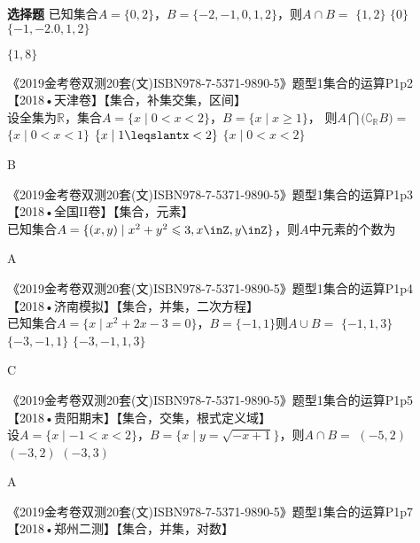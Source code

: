 \begin{exercise}{\bf 选择题}
      已知集合$A=\{0,2\}$，$B=\{-2,-1,0,1,2\}$，则$A\cap B=$\xz
       {$\{1,2\}$}
       {$\{0\}$}
       {$\{-1,-2.0,1,2\}$}
      \begin{answer}
        $\{1,8\}$
      \end{answer}
    \item 《2019金考卷双测20套(文)ISBN978-7-5371-9890-5》题型1集合的运算P1p2【2018•天津卷】【集合，补集交集，区间】\\
      设全集为$\mathbb{R}$，集合$A=\{x\mid 0<x<2\}$，$B=\{x\mid x\geqslant1\}$，
      则$A\bigcap\bigl(\complement_{\mathbb R}B\bigr)=$\xz
       {$\{x\mid 0<x<1\}$}
       {$\{x\mid 1\leqslantx<2\}$}
       {$\{x\mid 0<x<2\}$}
      \begin{answer}
        B
      \end{answer}
    \item 《2019金考卷双测20套(文)ISBN978-7-5371-9890-5》题型1集合的运算P1p3【2018•全国II卷】【集合，元素】\\
      已知集合$A=\{(x,y)\mid x^2+y^2\leqslant3,x\inZ,y\inZ\}$，则$A$中元素的个数为\xz
      \begin{answer}
        A
      \end{answer}
    \item 《2019金考卷双测20套(文)ISBN978-7-5371-9890-5》题型1集合的运算P1p4【2018•济南模拟】【集合，并集，二次方程】\\
      已知集合$A=\{x\mid x^2+2x-3=0\}$，$B=\{-1,1\}$则$A\cup B=$\xz
       {$\{-1,1,3\}$}
       {$\{-3,-1,1\}$}
       {$\{-3,-1,1,3\}$}
      \begin{answer}
        C
      \end{answer}
        \item 《2019金考卷双测20套(文)ISBN978-7-5371-9890-5》题型1集合的运算P1p5【2018•贵阳期末】【集合，交集，根式定义域】\\
          设$A=\{x\mid -1<x<2\}$，$B=\{x\mid y=\sqrt{-x+1}\}$，则$A\cap B=$\xz
          \xx{$(-1,1]$}
           {$(-5,2)$}
           {$(-3,2)$}
           {$(-3,3)$}
          \begin{answer}
            A
          \end{answer}
    \item 《2019金考卷双测20套(文)ISBN978-7-5371-9890-5》题型1集合的运算P1p7【2018•郑州二测】【集合，并集，对数】\\

\end{exercise}
